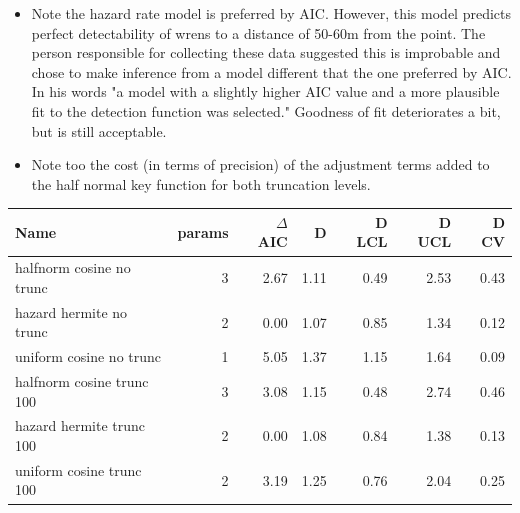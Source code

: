 \documentclass[a4paper, 10pt]{article}
\begin{document}
{%
	\begin{tcolorbox}[colback=green!5!white, colframe=green!60!black, title=Remarks about analysis of the snapshot wren analysis]
	\begin{itemize}
		\item Note the hazard rate model is preferred by AIC.  However, this model predicts perfect detectability of wrens to a distance of 50-60m from the point.  The person responsible for collecting these data suggested this is improbable and chose to make inference from a model different that the one preferred by AIC.  In his words "a model with a slightly higher AIC value and a more plausible fit to the detection function was selected." Goodness of fit deteriorates a bit, but is still acceptable.
		\item Note too the cost (in terms of precision) of the adjustment terms added to the half normal key function for both truncation levels.
	\end{itemize}

{\small
\begin{tabular}{lrrrrrr}
Name                      & params & $\Delta$ AIC & D    & D LCL & D UCL & D CV \\
\hline
halfnorm cosine no trunc  & 3      & 2.67      & 1.11 & 0.49  & 2.53  & 0.43 \\
hazard hermite no trunc   & 2      & 0.00      & 1.07 & 0.85  & 1.34  & 0.12 \\
uniform cosine no trunc   & 1      & 5.05      & 1.37 & 1.15  & 1.64  & 0.09 \\
\hline
halfnorm cosine trunc 100 & 3      & 3.08      & 1.15 & 0.48  & 2.74  & 0.46 \\
hazard hermite trunc 100  & 2      & 0.00      & 1.08 & 0.84  & 1.38  & 0.13 \\
uniform cosine trunc 100  & 2      & 3.19      & 1.25 & 0.76  & 2.04  & 0.25
\end{tabular}
}
	\end{tcolorbox}

}%
{%
}

\printbibliography
\end{document}
